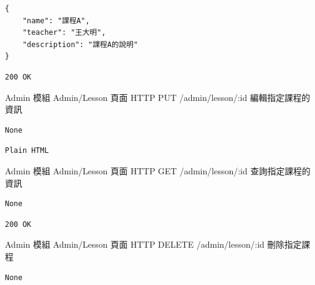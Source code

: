 \documentclass{article}
\begin{document}
\bigskip

\begin{lrbox}{\jsoninputbox}
	\begin{lstlisting}[basicstyle=\tiny\ttfamily]
{
	"name": "課程A",
	"teacher": "王大明",
	"description": "課程A的說明"
}
\end{lstlisting}
\end{lrbox}

\begin{lrbox}{\jsonoutputbox}
	\begin{lstlisting}
200 OK
\end{lstlisting}
\end{lrbox}

{Admin 模組}
{Admin/Lesson 頁面}
{HTTP PUT}
{/admin/lesson/:id}
{編輯指定課程的資訊}

\bigskip

\begin{lrbox}{\jsoninputbox}
	\begin{lstlisting}
None
\end{lstlisting}
\end{lrbox}

\begin{lrbox}{\jsonoutputbox}
	\begin{lstlisting}
Plain HTML
\end{lstlisting}
\end{lrbox}

{Admin 模組}
{Admin/Lesson 頁面}
{HTTP GET}
{/admin/lesson/:id}
{查詢指定課程的資訊}

\bigskip

\begin{lrbox}{\jsoninputbox}
	\begin{lstlisting}
None
\end{lstlisting}
\end{lrbox}

\begin{lrbox}{\jsonoutputbox}
	\begin{lstlisting}
200 OK
\end{lstlisting}
\end{lrbox}

{Admin 模組}
{Admin/Lesson 頁面}
{HTTP DELETE}
{/admin/lesson/:id}
{刪除指定課程}

\bigskip

\begin{lrbox}{\jsoninputbox}
	\begin{lstlisting}
None
\end{lstlisting}
\end{lrbox}
\end{document}
